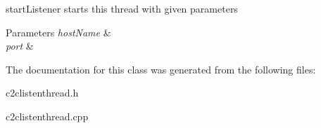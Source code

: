 start\-Listener starts this thread with given parameters 


\begin{DoxyParams}{Parameters}
{\em host\-Name} & \\
\hline
{\em port} & \\
\hline
\end{DoxyParams}


The documentation for this class was generated from the following files\-:\begin{DoxyCompactItemize}
\item 
c2clistenthread.\-h\item 
c2clistenthread.\-cpp\end{DoxyCompactItemize}

